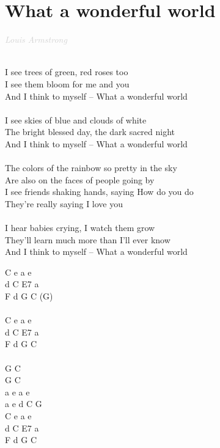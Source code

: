 \documentclass[a5paper, 10pt]{book}
\begin{document}
\section{What a wonderful world}\textcolor{lightgray}{\textit{Louis Armstrong}}\\~\\
\begin{minipage}[t]{0.8\textwidth}
I see trees of green, red roses too\\
I see them bloom for me and you\\
And I think to myself – What a wonderful world \\
\\
I see skies of blue and clouds of white\\
The bright blessed day, the dark sacred night\\
And I think to myself – What a wonderful world\\
\\
\hspace*{5mm}The colors of the rainbow so pretty in the sky\\
\hspace*{5mm}Are also on the faces of people going by\\
\hspace*{5mm}I see friends shaking hands, saying How do you do \\
\hspace*{5mm}They're really saying I love you \\
\\
I hear babies crying, I watch them grow\\
They'll learn much more than I'll ever know\\
And I think to myself – What a wonderful world\\
\end{minipage}
\begin{minipage}[t]{0.2\textwidth}
 C e a e\\
 d C E7 a\\
F d G C (G)\\
\\
 C e a e\\
 d C E7 a\\
 F d G C\\
 \\
 G C\\
 G C\\
a e a e\\
a e d C G\\

 C e a e\\
 d C E7 a\\
 F d G C\\
\end{minipage}
\end{document}
